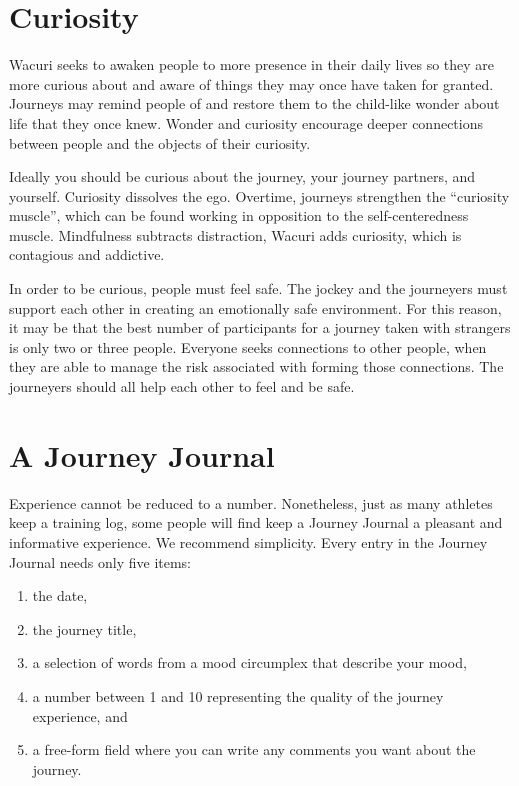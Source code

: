 \documentclass[12pt]{book}
\begin{document}
			
\chapter{Curiosity}

Wacuri seeks to awaken people to more presence in their daily lives so they are more curious about and aware of things they may once have taken for granted. Journeys may remind people of and restore them to the child-like wonder about life that they once knew. Wonder and curiosity encourage deeper connections between people and the objects of their curiosity.
					
Ideally you should be curious about the journey, your journey partners, and yourself. Curiosity dissolves the ego. Overtime, journeys strengthen the “curiosity muscle”, which can be found working in opposition to the self-centeredness muscle. Mindfulness subtracts distraction, Wacuri adds curiosity, which is contagious and addictive.
					
In order to be curious, people must feel safe. The jockey and the journeyers must support each other in creating an emotionally safe environment. For this reason, it may be that the best number of participants for a journey taken with strangers is only two or three people. Everyone seeks connections to other people, when they are able to manage the risk associated with forming those connections. The journeyers should all help each other to feel and be safe.


\chapter{A Journey Journal}

Experience cannot be reduced to a number.  Nonetheless, just
as many athletes keep a training log, some people will find
keep a Journey Journal a pleasant and informative experience.
We recommend simplicity. Every entry in the Journey Journal
needs only five items:
\begin{enumerate}
\item the date,
\item the journey title,
\item a selection of words from a mood circumplex that
  describe your mood,
\item a number between 1 and 10 representing the quality of
  the journey experience, and
\item a free-form field where you can write any comments
  you want about the journey.
\end{enumerate}
\end{document}
